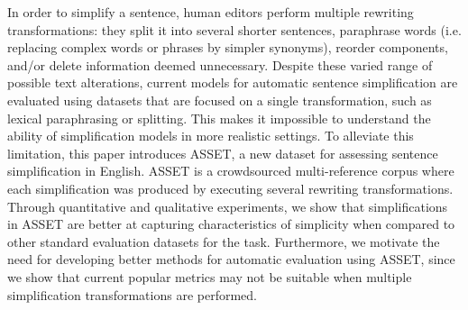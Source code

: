 In order to simplify a sentence, human editors perform multiple rewriting transformations: they split it into several shorter sentences,  paraphrase words (i.e. replacing complex words or phrases by simpler synonyms), reorder components, and/or delete information deemed unnecessary. Despite these varied range of possible text alterations, current models for automatic sentence simplification are evaluated using datasets that are focused on a single transformation, such as lexical paraphrasing or splitting. This makes it impossible to understand the ability of simplification models in more  realistic settings. To alleviate this limitation, this paper introduces ASSET, a new dataset for assessing sentence simplification in English. ASSET is a crowdsourced multi-reference corpus where each simplification was produced by executing several rewriting transformations. Through quantitative and qualitative experiments, we show that simplifications in ASSET are better at capturing characteristics of simplicity when compared to other standard evaluation datasets for the task. Furthermore, we motivate the need for developing better methods for automatic evaluation using ASSET, since we show that current popular metrics may not be suitable when multiple simplification transformations are performed.
